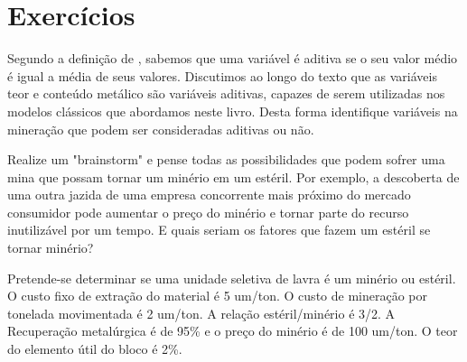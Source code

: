 \section{Exercícios}
\begin{exercise} 
	Segundo a definição de \citet{carrasco2008additivity}, sabemos que uma variável é aditiva se o seu valor médio é igual a média de seus valores. Discutimos ao longo do texto que as variáveis teor e conteúdo metálico são variáveis aditivas, capazes de serem utilizadas nos modelos clássicos que abordamos neste livro. Desta forma identifique variáveis na mineração que podem ser consideradas aditivas ou não.

\end{exercise}
\begin{exercise}
	Realize um "brainstorm" e pense todas as possibilidades que podem sofrer uma mina que possam tornar um minério em um estéril. Por exemplo, a descoberta de uma outra jazida de uma empresa concorrente mais próximo do mercado consumidor pode aumentar o preço do minério e tornar parte do recurso inutilizável por um tempo. E quais seriam os fatores que fazem um estéril se tornar minério? 
\end{exercise}
\begin{exercise}
	Pretende-se determinar se uma unidade seletiva de lavra é um minério ou estéril. O custo fixo de extração do material é 5 um/ton. O custo de mineração por tonelada movimentada é 2 um/ton. A relação estéril/minério é 3/2. A Recuperação metalúrgica é de 95\% e o preço do minério é de 100 um/ton. O teor do elemento útil do bloco é 2\%. 
\end{exercise}

